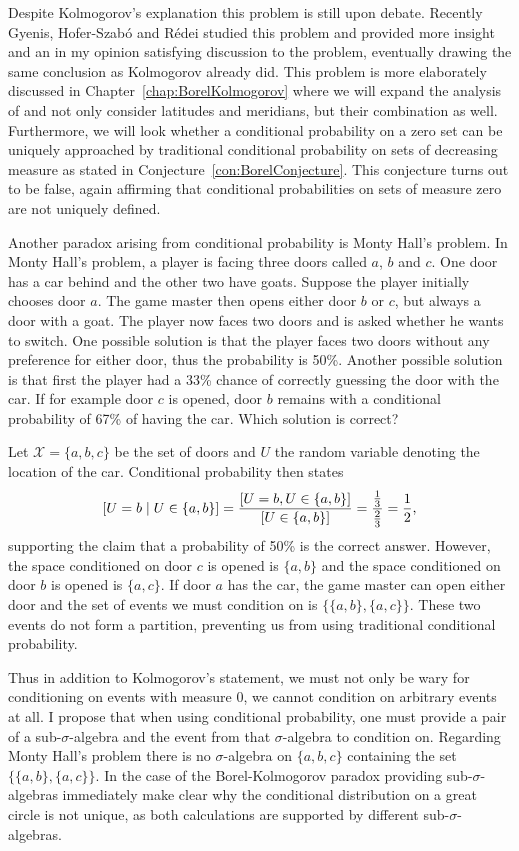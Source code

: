 \documentclass[a4paper]{report}
\theoremstyle{plain}
\theoremstyle{definition}
\theoremstyle{remark}
\numberwithin{equation}{chapter}
\let\P\relax
\DeclareMathOperator{\P}{\mathbb{P}}
\DeclareMathOperator{\1}{\mathbbm{1}}
\newcommand{\X}{\mathcal{X}}
\begin{document}
Despite Kolmogorov's explanation this problem is still upon debate. Recently Gyenis, Hofer-Szabó and Rédei \cite{Gyenis17} studied this problem and provided more insight and an in my opinion satisfying discussion to the problem, eventually drawing the same conclusion as Kolmogorov already did. This problem is more elaborately discussed in Chapter~\ref{chap:BorelKolmogorov} where we will expand the analysis of \cite{Gyenis17} and not only consider latitudes and meridians, but their combination as well. Furthermore, we will look whether a conditional probability on a zero set can be uniquely approached by traditional conditional probability on sets of decreasing measure as stated in Conjecture~\ref{con:BorelConjecture}. This conjecture turns out to be false, again affirming that conditional probabilities on sets of measure zero are not uniquely defined.

Another paradox arising from conditional probability is Monty Hall's problem. In Monty Hall's problem, a player is facing three doors called $a$, $b$ and $c$. One door has a car behind and the other two have goats. Suppose the player initially chooses door $a$. The game master then opens either door $b$ or $c$, but always a door with a goat. The player now faces two doors and is asked whether he wants to switch. One possible solution is that the player faces two doors without any preference for either door, thus the probability is 50\%. Another possible solution is that first the player had a 33\% chance of correctly guessing the door with the car. If for example door $c$ is opened, door $b$ remains with a conditional probability of 67\% of having the car. Which solution is correct?

Let $\X=\{a,b,c\}$ be the set of doors and $U$ the random variable denoting the location of the car. Conditional probability then states
\begin{equation*}\label{eq:IntMonty}
\P[U=b\mid U\in\{a,b\}]=\frac{\P[U=b,U\in\{a,b\}]}{\P[U\in\{a,b\}]}=\frac{\frac{1}{3}}{\frac{2}{3}}=\frac{1}{2},
\end{equation*}
supporting the claim that a probability of 50\% is the correct answer. However, the space conditioned on door $c$ is opened is $\{a,b\}$ and the space conditioned on door $b$ is opened is $\{a,c\}$. If door $a$ has the car, the game master can open either door and the set of events we must condition on is $\{\{a,b\},\{a,c\}\}$. These two events do not form a partition, preventing us from using traditional conditional probability.

Thus in addition to Kolmogorov's statement, we must not only be wary for conditioning on events with measure 0, we cannot condition on arbitrary events at all. I propose that when using conditional probability, one must provide a pair of a sub-$\sigma$-algebra and the event from that $\sigma$-algebra to condition on. Regarding Monty Hall's problem there is no $\sigma$-algebra on $\{a,b,c\}$ containing the set $\{\{a,b\},\{a,c\}\}$. In the case of the Borel-Kolmogorov paradox providing sub-$\sigma$-algebras immediately make clear why the conditional distribution on a great circle is not unique, as both calculations are supported by different sub-$\sigma$-algebras.
\end{document}

